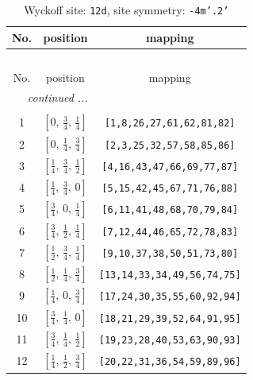 \documentclass[fleqn,8pt]{jsarticle}
\begin{document}
\begin{longtable}{ccc}
\caption{Wyckoff site: {\tt 12d}, site symmetry: {\tt -4m'.2'}}
 \\
 \hline \hline
No. & position & mapping \\ \hline \endfirsthead

\multicolumn{2}{l}{\tablename\ \thetable{}} \\
 \hline \hline
No. & position & mapping \\ \hline \endhead

 \hline \hline
\multicolumn{2}{r}{\footnotesize\it continued ...} \\ \endfoot

 \hline \hline
\multicolumn{2}{r}{} \\ \endlastfoot

1 & $\left[ 0,\, \frac{3}{4},\, \frac{1}{4} \right]$ & {\tt [1,8,26,27,61,62,81,82]} \\ \hline
2 & $\left[ 0,\, \frac{1}{4},\, \frac{3}{4} \right]$ & {\tt [2,3,25,32,57,58,85,86]} \\ \hline
3 & $\left[ \frac{1}{4},\, \frac{3}{4},\, \frac{1}{2} \right]$ & {\tt [4,16,43,47,66,69,77,87]} \\ \hline
4 & $\left[ \frac{1}{4},\, \frac{3}{4},\, 0 \right]$ & {\tt [5,15,42,45,67,71,76,88]} \\ \hline
5 & $\left[ \frac{3}{4},\, 0,\, \frac{1}{4} \right]$ & {\tt [6,11,41,48,68,70,79,84]} \\ \hline
6 & $\left[ \frac{3}{4},\, \frac{1}{2},\, \frac{1}{4} \right]$ & {\tt [7,12,44,46,65,72,78,83]} \\ \hline
7 & $\left[ \frac{1}{2},\, \frac{3}{4},\, \frac{1}{4} \right]$ & {\tt [9,10,37,38,50,51,73,80]} \\ \hline
8 & $\left[ \frac{1}{2},\, \frac{1}{4},\, \frac{3}{4} \right]$ & {\tt [13,14,33,34,49,56,74,75]} \\ \hline
9 & $\left[ \frac{1}{4},\, 0,\, \frac{3}{4} \right]$ & {\tt [17,24,30,35,55,60,92,94]} \\ \hline
10 & $\left[ \frac{3}{4},\, \frac{1}{4},\, 0 \right]$ & {\tt [18,21,29,39,52,64,91,95]} \\ \hline
11 & $\left[ \frac{3}{4},\, \frac{1}{4},\, \frac{1}{2} \right]$ & {\tt [19,23,28,40,53,63,90,93]} \\ \hline
12 & $\left[ \frac{1}{4},\, \frac{1}{2},\, \frac{3}{4} \right]$ & {\tt [20,22,31,36,54,59,89,96]} \\
\end{longtable}
\renewcommand{\arraystretch}{1.2}
\end{document}
